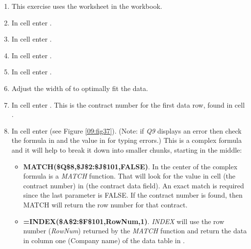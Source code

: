 \begin{enumerate}
	\item This exercise uses the  worksheet in the  workbook.
	\item In cell  enter .
	\item In cell  enter .
	\item In cell  enter .
	\item In cell  enter .
	\item Adjust the width of  to optimally fit the data.
	\item In cell  enter . This is the contract number for the first data row, found in cell .
	\item In cell  enter  (see Figure \ref{09:fig37}). (Note: if \textit{Q9} displays an error then check the formula in  and the value in  for typing errors.) This is a complex formula and it will help to break it down into smaller chunks, starting in the middle: 
	
	\begin{itemize}
		\item \textbf{MATCH(\$Q\$8,\$J\$2:\$J\$101,FALSE)}. In the center of the complex formula is a \textit{MATCH} function. That will look for the value in cell  (the contract number) in  (the contract data field). An exact match is required since the last parameter is FALSE. If the contract number is found, then MATCH will return the row number for that contract.
		\item \textbf{=INDEX(\$A\$2:\$F\$101,RowNum,1)}. \textit{INDEX} will use the row number (\textit{RowNum}) returned by the \textit{MATCH} function and return the data in column one (Company name) of the data table in .
	\end{itemize}
		

\end{enumerate}
